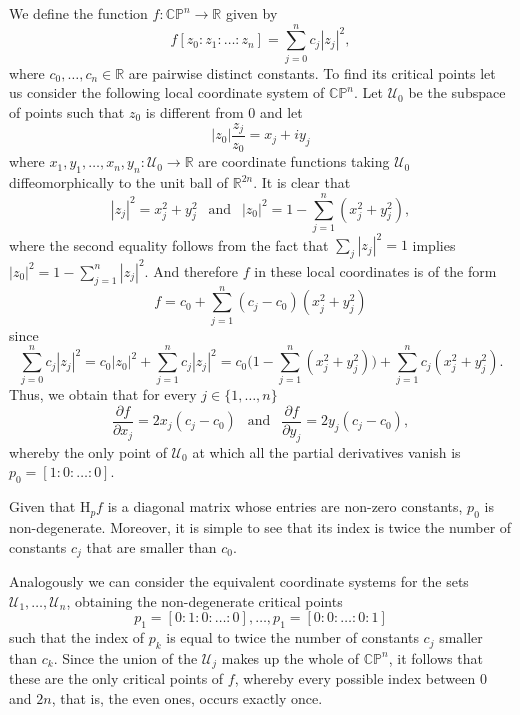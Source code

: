 We define the function $f:\mathbb{CP}^n \to \mathbb{R}$ given by
\begin{equation*}
    f[z_0:z_1:\dots:z_n] = \sum_{j=0}^n c_j |z_j|^2,
\end{equation*}
where $c_0,\dots,c_n\in \mathbb{R}$ are pairwise distinct constants. To find its critical points let us consider the following local coordinate system of $\mathbb{CP}^n$. Let $\mathcal{U}_0$ be the subspace of points such that $z_0$ is different from $0$ and let
\begin{equation*}
    |z_0|\frac{z_j}{z_0} = x_j + iy_j
\end{equation*}
where $x_1,y_1,\dots,x_n,y_n : \mathcal{U}_0\to \mathbb{R}$ are coordinate functions taking $\mathcal{U}_0$ diffeomorphically to the unit ball of $\mathbb{R}^{2n}$. It is clear that
\begin{equation*}
    |z_j|^2 = x_j^2 + y_j^2 ~~\text{ and }~~ |z_0|^2 = 1 - \sum_{j=1}^n (x_j^2 + y_j^2),
\end{equation*}
where the second equality follows from the fact that $\sum_j |z_j|^2=1$ implies $|z_0|^2 = 1 - \sum_{j=1}^n |z_j|^2 $. And therefore $f$ in these local coordinates is of the form
\begin{equation*}
    f = c_0 + \sum_{j=1}^n (c_j-c_0)(x_j^2 + y_j^2)
\end{equation*}
since
\begin{equation*}
    \sum_{j=0}^n c_j |z_j|^2 = c_0|z_0|^2 + \sum_{j=1}^n c_j |z_j|^2 = c_0 \Big(1 - \sum_{j=1}^n (x_j^2 + y_j^2) \Big) + \sum_{j=1}^n c_j(x_j^2 + y_j^2).
\end{equation*}
Thus, we obtain that for every $j\in\{1,\dots,n\}$
\begin{equation*}
    \frac{\partial f}{\partial x_j} = 2x_j(c_j - c_0) ~~\text{ and }~~ \frac{\partial f}{\partial y_j} = 2y_j(c_j - c_0),
\end{equation*}
whereby the only point of $\mathcal{U}_0$ at which all the partial derivatives vanish is $p_0 = [1:0:\dots:0]$.

Given that $\text{H}_p f$ is a diagonal matrix whose entries are non-zero constants, $p_0$ is non-degenerate. Moreover, it is simple to see that its index is twice the number of constants $c_j$ that are smaller than $c_0$.

Analogously we can consider the equivalent coordinate systems for the sets $\mathcal{U}_1, \dots, \mathcal{U}_n$, obtaining the non-degenerate critical points
\begin{equation*}
    p_1 = [0:1:0:\dots:0], \dots, p_1 = [0:0:\dots:0:1] %
\end{equation*}
such that the index of $p_k$ is equal to twice the number of constants $c_j$ smaller than $c_k$. Since the union of the $\mathcal{U}_j$ makes up the whole of $\mathbb{CP}^n$, it follows that these are the only critical points of $f$, whereby every possible index between $0$ and $2n$, that is, the even ones, occurs exactly once.

